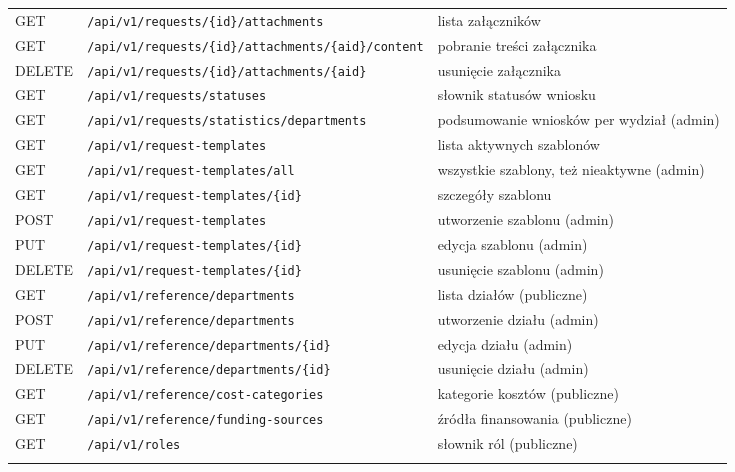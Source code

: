\documentclass[12pt,a4paper]{article}
\begin{document}
\begin{longtable}{@{}l >{\raggedright\arraybackslash}p{} >{\raggedright\arraybackslash}p{}@{}}
  GET & \nolinkurl{/api/v1/requests/{id}/attachments} & \small{lista załączników} \\ \addlinespace
  GET & \nolinkurl{/api/v1/requests/{id}/attachments/{aid}/content} & \small{pobranie treści załącznika} \\ \addlinespace
  DELETE & \nolinkurl{/api/v1/requests/{id}/attachments/{aid}} & \small{usunięcie załącznika} \\ \addlinespace
  GET & \nolinkurl{/api/v1/requests/statuses} & \small{słownik statusów wniosku} \\ \addlinespace
  GET & \nolinkurl{/api/v1/requests/statistics/departments} & \small{podsumowanie wniosków per wydział (admin)} \\
  \midrule
  GET & \nolinkurl{/api/v1/request-templates} & \small{lista aktywnych szablonów} \\ \addlinespace
  GET & \nolinkurl{/api/v1/request-templates/all} & \small{wszystkie szablony, też nieaktywne (admin)} \\ \addlinespace
  GET & \nolinkurl{/api/v1/request-templates/{id}} & \small{szczegóły szablonu} \\ \addlinespace
  POST & \nolinkurl{/api/v1/request-templates} & \small{utworzenie szablonu (admin)} \\ \addlinespace
  PUT & \nolinkurl{/api/v1/request-templates/{id}} & \small{edycja szablonu (admin)} \\ \addlinespace
  DELETE & \nolinkurl{/api/v1/request-templates/{id}} & \small{usunięcie szablonu (admin)} \\
  \midrule
  GET & \nolinkurl{/api/v1/reference/departments} & \small{lista działów (publiczne)} \\ \addlinespace
  POST & \nolinkurl{/api/v1/reference/departments} & \small{utworzenie działu (admin)} \\ \addlinespace
  PUT & \nolinkurl{/api/v1/reference/departments/{id}} & \small{edycja działu (admin)} \\ \addlinespace
  DELETE & \nolinkurl{/api/v1/reference/departments/{id}} & \small{usunięcie działu (admin)} \\ \addlinespace
  GET & \nolinkurl{/api/v1/reference/cost-categories} & \small{kategorie kosztów (publiczne)} \\ \addlinespace
  GET & \nolinkurl{/api/v1/reference/funding-sources} & \small{źródła finansowania (publiczne)} \\
  \midrule
  GET & \nolinkurl{/api/v1/roles} & \small{słownik ról (publiczne)} \\ \addlinespace

\end{longtable}
\end{document}
